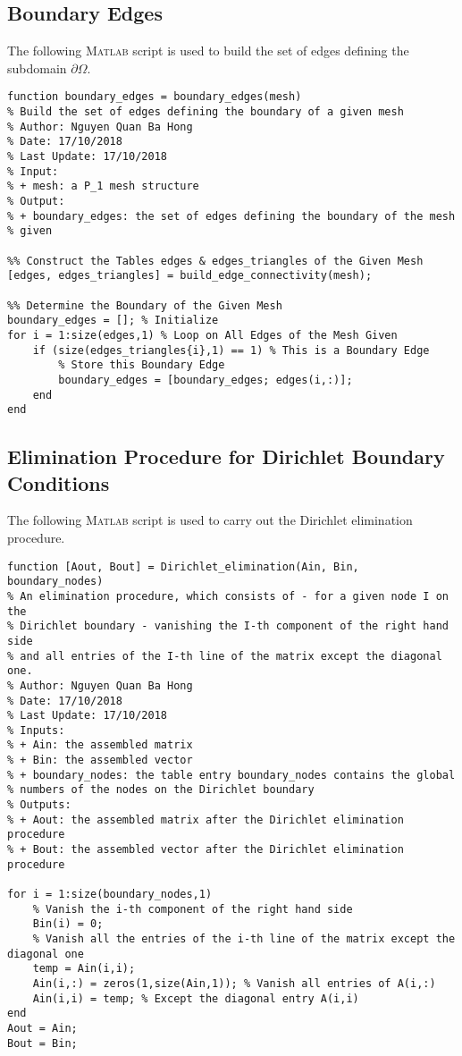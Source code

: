 \documentclass[11pt,a4paper,center,notitlepage]{article}
\numberwithin{equation}{section}
\begin{document}
\subsection{Boundary Edges}\label{sec8.7}
The following \textsc{Matlab} script is used to build the set of edges defining the subdomain $\partial \Omega$.
\begin{verbatim}
function boundary_edges = boundary_edges(mesh)
% Build the set of edges defining the boundary of a given mesh
% Author: Nguyen Quan Ba Hong
% Date: 17/10/2018
% Last Update: 17/10/2018
% Input:
% + mesh: a P_1 mesh structure
% Output:
% + boundary_edges: the set of edges defining the boundary of the mesh
% given

%% Construct the Tables edges & edges_triangles of the Given Mesh
[edges, edges_triangles] = build_edge_connectivity(mesh);

%% Determine the Boundary of the Given Mesh
boundary_edges = []; % Initialize
for i = 1:size(edges,1) % Loop on All Edges of the Mesh Given
    if (size(edges_triangles{i},1) == 1) % This is a Boundary Edge
        % Store this Boundary Edge
        boundary_edges = [boundary_edges; edges(i,:)]; 
    end
end
\end{verbatim}

\subsection{Elimination Procedure for Dirichlet Boundary Conditions}\label{sec8.8}
The following \textsc{Matlab} script is used to carry out the Dirichlet elimination procedure.
\begin{verbatim}
function [Aout, Bout] = Dirichlet_elimination(Ain, Bin, boundary_nodes)
% An elimination procedure, which consists of - for a given node I on the
% Dirichlet boundary - vanishing the I-th component of the right hand side
% and all entries of the I-th line of the matrix except the diagonal one. 
% Author: Nguyen Quan Ba Hong
% Date: 17/10/2018
% Last Update: 17/10/2018
% Inputs:
% + Ain: the assembled matrix
% + Bin: the assembled vector
% + boundary_nodes: the table entry boundary_nodes contains the global
% numbers of the nodes on the Dirichlet boundary
% Outputs:
% + Aout: the assembled matrix after the Dirichlet elimination procedure
% + Bout: the assembled vector after the Dirichlet elimination procedure

for i = 1:size(boundary_nodes,1)
    % Vanish the i-th component of the right hand side
    Bin(i) = 0;
    % Vanish all the entries of the i-th line of the matrix except the diagonal one
    temp = Ain(i,i);
    Ain(i,:) = zeros(1,size(Ain,1)); % Vanish all entries of A(i,:)
    Ain(i,i) = temp; % Except the diagonal entry A(i,i)    
end
Aout = Ain;
Bout = Bin;
\end{verbatim}
\end{document}
